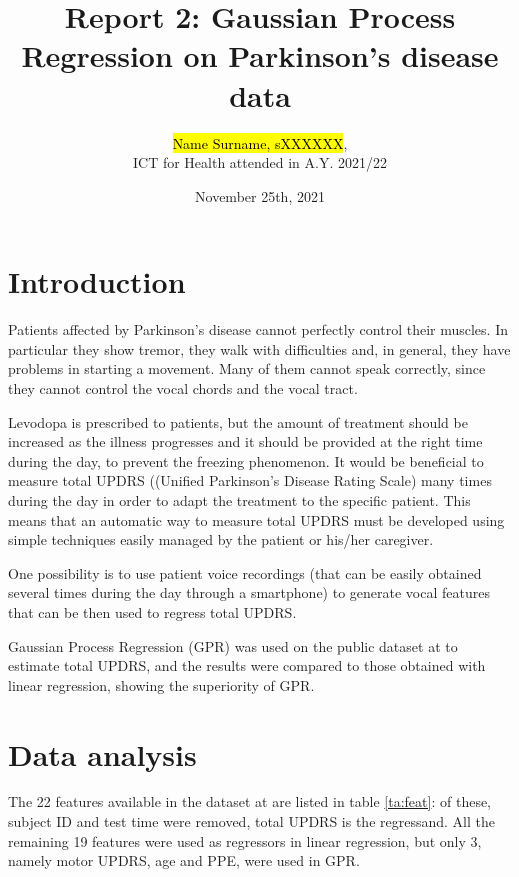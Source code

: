 \documentclass[12pt]{article}
\title{Report 2:
Gaussian Process Regression on Parkinson's disease data}
\author{\hl{Name Surname, sXXXXXX}, \\ICT for Health attended in A.Y. 2021/22}
\date{November 25th, 2021}
\begin{document}
\maketitle
\section{Introduction}
Patients affected by Parkinson’s disease cannot perfectly control their
muscles. In particular they show tremor, they walk with difficulties and,
in general, they have problems in starting a movement. Many of them
cannot speak correctly, since they cannot control the vocal chords and
the vocal tract. 

Levodopa is prescribed to patients, but the amount of treatment should be increased as the illness progresses and it should be provided at the right time during the day, to prevent the freezing phenomenon. It would be beneficial to measure total UPDRS ((Unified Parkinson’s Disease Rating Scale) many times during the day in order to adapt the treatment to the specific patient. This means that an automatic way to measure total UPDRS must be developed using simple techniques easily managed by the patient or his/her caregiver.

One possibility is to use patient voice recordings (that can be easily obtained several times during the day through a smartphone) to generate vocal features that can be then used to regress total UPDRS.

Gaussian Process Regression (GPR) was used on the public dataset at \cite{UCI} to estimate total UPDRS, and the results were compared to those obtained with linear regression, showing the superiority of GPR. 

\section{Data analysis}
The 22 features available in the dataset at \cite{UCI} are listed in table \ref{ta:feat}: of these, subject ID and test time were removed, total UPDRS is the regressand. All the remaining 19 features were used as regressors in linear regression, but only 3, namely motor UPDRS, age and PPE, were used in GPR.
\end{document}
